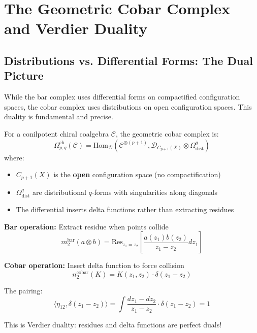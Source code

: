 
\section{The Geometric Cobar Complex and Verdier Duality}

\subsection{Distributions vs. Differential Forms: The Dual Picture}

While the bar complex uses differential forms on compactified configuration spaces, the cobar complex uses distributions on open configuration spaces. This duality is fundamental and precise.

\begin{definition}\label{def:geom-cobar-precise}
For a conilpotent chiral coalgebra $\mathcal{C}$, the geometric cobar complex is:
$$\Omega^{\text{ch}}_{p,q}(\mathcal{C}) = \text{Hom}_{\mathcal{D}}\left(\mathcal{C}^{\otimes(p+1)}, \mathcal{D}_{C_{p+1}(X)} \otimes \Omega^q_{\text{dist}}\right)$$
where:
\begin{itemize}
\item $C_{p+1}(X)$ is the \textbf{open} configuration space (no compactification)
\item $\Omega^q_{\text{dist}}$ are distributional $q$-forms with singularities along diagonals
\item The differential inserts delta functions rather than extracting residues
\end{itemize}
\end{definition}

\begin{example}
\textbf{Bar operation:} Extract residue when points collide
$$m_2^{\text{bar}}(a \otimes b) = \text{Res}_{z_1=z_2}\left[\frac{a(z_1)b(z_2)}{z_1-z_2}dz_1\right]$$

\textbf{Cobar operation:} Insert delta function to force collision
$$n_2^{\text{cobar}}(K) = K(z_1,z_2) \cdot \delta(z_1-z_2)$$

The pairing:
$$\langle \eta_{12}, \delta(z_1-z_2) \rangle = \int \frac{dz_1-dz_2}{z_1-z_2} \cdot \delta(z_1-z_2) = 1$$

This is Verdier duality: residues and delta functions are perfect duals!
\end{example}

